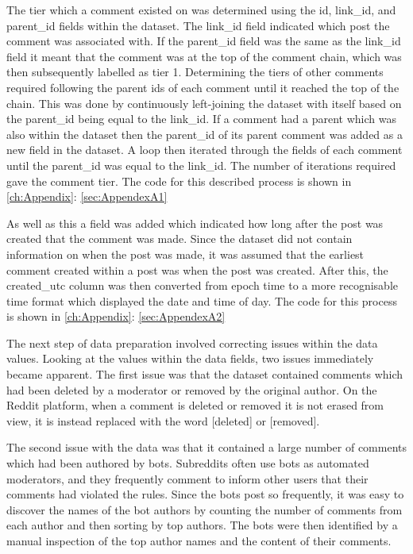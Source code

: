 The tier which a comment existed on was determined using the id, link\_id, and parent\_id fields within the dataset. The link\_id field indicated which post the comment was associated with. If the parent\_id field was the same as the link\_id field it meant that the comment was at the top of the comment chain, which was then subsequently labelled as tier 1. Determining the tiers of other comments required following the parent ids of each comment until it reached the top of the chain. This was done by continuously left-joining the dataset with itself based on the parent\_id being equal to the link\_id. If a comment had a parent which was also within the dataset then the parent\_id of its parent comment was added as a new field in the dataset. A loop then iterated through the fields of each comment until the parent\_id was equal to the link\_id. The number of iterations required gave the comment tier. The code for this described process is shown in \autoref{ch:Appendix}: \autoref{sec:AppendexA1}

As well as this a field was added which indicated how long after the post was created that the comment was made. Since the dataset did not contain information on when the post was made, it was assumed that the earliest comment created within a post was when the post was created. After this, the created\_utc column was then converted from epoch time to a more recognisable time format which displayed the date and time of day. The code for this process is shown in \autoref{ch:Appendix}: \autoref{sec:AppendexA2}

The next step of data preparation involved correcting issues within the data values. Looking at the values within the data fields, two issues immediately became apparent. The first issue was that the dataset contained comments which had been deleted by a moderator or removed by the original author. On the Reddit platform, when a comment is deleted or removed it is not erased from view, it is instead replaced with the word [deleted] or [removed]. 

The second issue with the data was that it contained a large number of comments which had been authored by bots. Subreddits often use bots as automated moderators, and they frequently comment to inform other users that their comments had violated the rules. Since the bots post so frequently, it was easy to discover the names of the bot authors by counting the number of comments from each author and then sorting by top authors. The bots were then identified by a manual inspection of the top author names and the content of their comments. 

